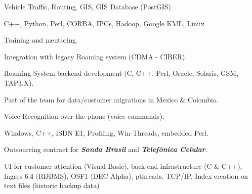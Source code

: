 \documentclass[letterpaper]{cvitae}
\begin{document}
\begin{minipage}[t]{0.64\textwidth}
\begin{tightitemize}
\item Vehicle Traffic, Routing, GIS, GIS Database (PostGIS)
\item C++, Python, Perl, CORBA, IPCs, Hadoop, Google KML, Linux
\item Training and mentoring.
\end{tightitemize}

\sectionspace


\begin{tightitemize}
\item Integration with legacy Roaming system (CDMA - CIBER).
\item Roaming System backend development (C, C++, Perl, Oracle, Solaris, GSM, TAP3.X).
\item Part of the team for data/customer migrations in Mexico \& Colombia.
\end{tightitemize}

\sectionspace


\begin{tightitemize}
\item Voice Recognition over the phone (voice commands).
\item Windows, C++, ISDN E1, Profiling, Win-Threads, embedded Perl.
\end{tightitemize}

\sectionspace


\begin{tightitemize}
\item Outsourcing contract for \textbf{\textit{Sonda Brasil}} and \textbf{\textit{Telefônica Celular}}.
\item UI for customer attention (Visual Basic), back-end infrastructure (C \& C++), Ingres 6.4 (RDBMS), OSF1 (DEC Alpha), pthreads, TCP/IP, Index creation on text files (historic backup data)
\end{tightitemize}


\end{minipage}
\end{document}
